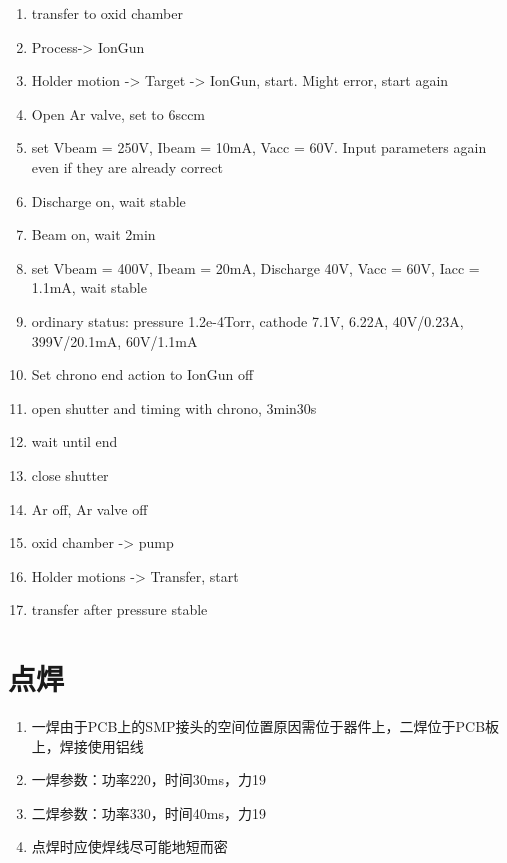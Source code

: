 \begin{enumerate}
    \item transfer to oxid chamber
    \item Process-> IonGun
    \item Holder motion -> Target -> IonGun, start. Might error, start again
    \item Open Ar valve, set to 6sccm
    \item set Vbeam = 250V, Ibeam = 10mA, Vacc = 60V. Input parameters again even if they are already correct
    \item Discharge on, wait stable
    \item Beam on, wait 2min
    \item set Vbeam = 400V, Ibeam = 20mA, Discharge 40V, Vacc = 60V, Iacc = 1.1mA, wait stable
    \item ordinary status: pressure 1.2e-4Torr, cathode 7.1V, 6.22A, 40V/0.23A, 399V/20.1mA, 60V/1.1mA
    \item Set chrono end action to IonGun off
    \item open shutter and timing with chrono, 3min30s
    \item wait until end
    \item close shutter
    \item Ar off, Ar valve off
    \item oxid chamber -> pump
    \item Holder motions -> Transfer, start
    \item transfer after pressure stable
\end{enumerate}


\section{点焊} %
\label{sec:点焊}
    \begin{enumerate}
        \item 一焊由于PCB上的SMP接头的空间位置原因需位于器件上，二焊位于PCB板上，焊接使用铝线
        \item 一焊参数：功率220，时间30ms，力19
        \item 二焊参数：功率330，时间40ms，力19
        \item 点焊时应使焊线尽可能地短而密
    \end{enumerate}
  

















